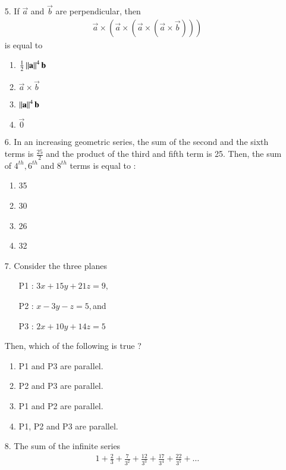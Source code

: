 \documentclass[journal,12pt,onecolumn]{IEEEtran}
\theoremstyle{remark}
\begin{document}
\begin{enumerate}
	\item[5.] If $\vec{a}$ and $\vec{b}$ are perpendicular, then 
	\begin{align*}
		\vec{a} \times \left(\vec{a} \times \left(\vec{a} \times \left(\vec{a} \times \vec{b}\right)\right)\right)
	\end{align*}
	is equal to 
		\begin{enumerate}
			\item $\frac{1}{2}\left\lVert\mathbf{a}\right\rVert^4 \mathbf{b}$ 
			\item $\vec{a} \times \vec{b}$ 
			\item $\left\lVert\mathbf{a}\right\rVert^4 \mathbf{b}$  
			\item $\vec{0}$
		\end{enumerate}
	\item[6.]
		In an increasing geometric series, the sum of the second and the sixth terms is $\frac{25}{2}$
		and the product of the third and fifth term is 25. Then, the sum of $4^{th}, 6^{th}$ and $8^{th}$ terms
		is equal to :
		\begin{multicols}{4}
		\begin{enumerate}
			\item 35 \columnbreak
			\item 30 \columnbreak
			\item 26 \columnbreak
			\item 32
		\end{enumerate}
	\end{multicols}
	\item[7.] Consider the three planes
		\begin{enumerate}
			\item[P1 :] $3x + 15y + 21z = 9,$
			\item[P2 :] $x - 3y - z = 5, $and 
			\item[P3 :] $2x + 10y + 14z = 5$
		\end{enumerate}
		Then, which of the following is true ?	
		\begin{enumerate}
			\item P1 and P3 are parallel. 
			\item P2 and P3 are parallel. 
			\item P1 and P2 are parallel. 
			\item P1, P2 and P3 are parallel.
		\end{enumerate}
\item[8.]
	The sum of the infinite series
	\begin{align}
		1 + \frac{2}{3} + \frac{7}{3^2} + \frac{12}{3^3} + \frac{17}{3^4} + \frac{22}{3^5} + \dots

\end{align}
\end{enumerate}
\end{document}
